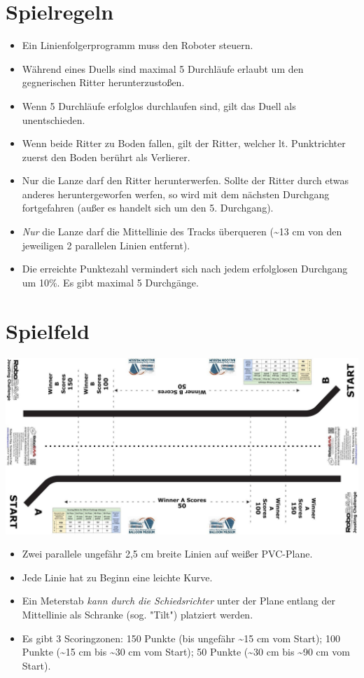 \documentclass[a4paper,12pt]{article}
\begin{document}
\section{Spielregeln}
\begin{itemize}
	\item Ein Linienfolgerprogramm muss den Roboter steuern.
	
	\item Während eines Duells sind maximal 5 Durchläufe erlaubt um den gegnerischen Ritter herunterzustoßen.
	\item Wenn 5 Durchläufe erfolglos durchlaufen sind, gilt das Duell als unentschieden.
	\item Wenn beide Ritter zu Boden fallen, gilt der Ritter, welcher lt. Punktrichter zuerst den Boden berührt als
	Verlierer.
	\item Nur die Lanze darf den Ritter herunterwerfen. Sollte der Ritter durch etwas anderes heruntergeworfen werfen,
	so wird mit dem nächsten Durchgang fortgefahren (außer es handelt sich um den 5. Durchgang).
	\item \emph{Nur} die Lanze darf die Mittellinie des Tracks überqueren (\textasciitilde13 cm von den jeweiligen 2 parallelen Linien entfernt).
	\item Die erreichte Punktezahl vermindert sich nach jedem erfolglosen Durchgang um 10\%. Es gibt maximal 5 Durchgänge.
\end{itemize}
\section{Spielfeld}
\includegraphics[width=1\textwidth]{track.png}
\begin{itemize}
	\item Zwei parallele ungefähr 2,5 cm breite Linien auf weißer PVC-Plane.
	\item Jede Linie hat zu Beginn eine leichte Kurve.
	\item Ein Meterstab \emph{kann durch die Schiedsrichter} unter der Plane entlang der Mittellinie als Schranke (sog. "Tilt") platziert werden.
	\item Es gibt 3 Scoringzonen: 150 Punkte (bis ungefähr \textasciitilde15 cm vom Start); 100 Punkte (\textasciitilde15 cm bis \textasciitilde30 cm vom
	Start); 50 Punkte (\textasciitilde30 cm bis \textasciitilde90 cm vom Start).
\end{itemize}
\end{document}
